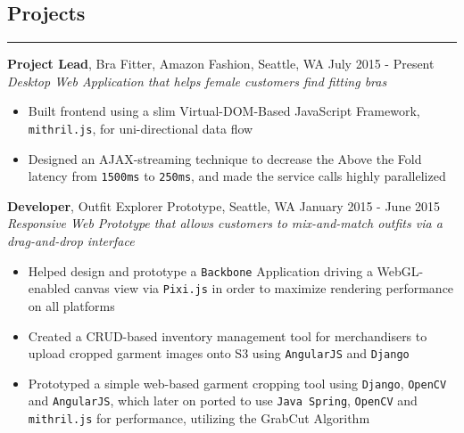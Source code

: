 \documentclass[line]{res} %
\begin{document}
\begin{resume}
  \section{Projects}
  \rule{\textwidth}{1pt}
    \textbf{Project Lead}, Bra Fitter, Amazon Fashion, Seattle, WA
    \hfill July 2015 - Present \\
    \textit{Desktop Web Application that helps female customers find fitting bras}
    \begin{itemize} \itemsep -2pt  %
      \item Built frontend using a slim Virtual-DOM-Based JavaScript Framework,
            \texttt{mithril.js}, for uni-directional data flow
      \item Designed an AJAX-streaming technique to decrease the Above the Fold latency from \texttt{1500ms} to
            \texttt{250ms}, and made the service calls highly parallelized
		\end{itemize}

    \textbf{Developer}, Outfit Explorer Prototype, Seattle, WA
    \hfill January 2015 - June 2015 \\
    \textit{Responsive Web Prototype that allows customers to mix-and-match outfits
            via a drag-and-drop interface}
    \begin{itemize} \itemsep -2pt  %
      \item Helped design and prototype a \texttt{Backbone} Application driving a WebGL-enabled canvas view via
            \texttt{Pixi.js} in order to maximize rendering performance on all platforms
      \item Created a CRUD-based inventory management tool for merchandisers to upload cropped garment images onto S3
            using \texttt{AngularJS} and \texttt{Django}
      \item Prototyped a simple web-based garment cropping tool using \texttt{Django}, \texttt{OpenCV} and
            \texttt{AngularJS}, which later on ported to use \texttt{Java Spring}, \texttt{OpenCV} and
            \texttt{mithril.js} for performance, utilizing the GrabCut Algorithm
    \end{itemize}


\end{resume}
\end{document}
